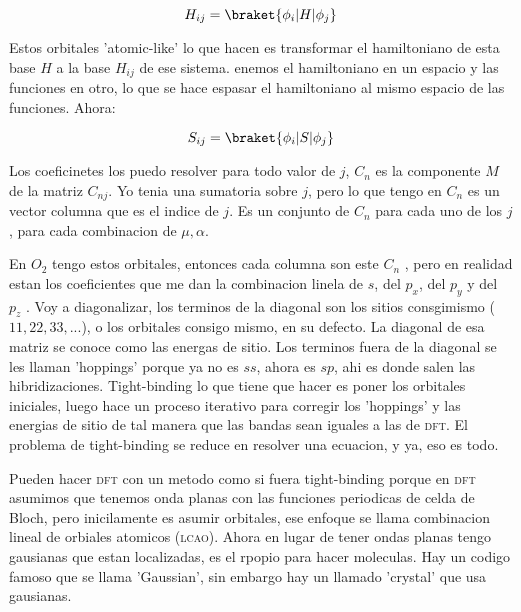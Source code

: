 \documentclass[11pt,fleqn]{book}
\begin{document}
\begin{equation}
    H_{ij}=\braket{\phi_{i}|H|\phi_{j}}
\end{equation}

Estos orbitales 'atomic-like' lo que hacen es transformar el hamiltoniano de esta base $H$ a la base $H_{ij}$ de ese sistema. enemos el hamiltoniano en un espacio y las funciones en otro, lo que se hace espasar el hamiltoniano al mismo espacio de las funciones. Ahora:

\begin{equation}
    S_{ij}=\braket{\phi_{i}|S|\phi_{j}}
\end{equation}

Los coeficinetes los puedo resolver para todo valor de $j$, $C_{n}$ es la componente $M$ de la matriz $C_{nj}$. Yo tenia una sumatoria sobre $j$, pero lo que tengo en $C_{n}$ es un vector columna que es el indice de $j$. Es un conjunto de $C_{n}$ para cada uno de los $j$, para cada combinacion de $\mu,\alpha$.


En $O_{2}$ tengo estos orbitales, entonces cada columna son este $C_{n}$ , pero en realidad estan los coeficientes que me dan la combinacion linela de $s$, del $p_{x}$, del $p_{y}$ y del $p_{z}$ . Voy a diagonalizar, los terminos de la diagonal son los sitios consgimismo ($11, 22, 33,...$), o los orbitales consigo mismo, en su defecto. La diagonal de esa matriz se conoce como las energas de sitio. Los terminos  fuera de la diagonal se les llaman 'hoppings' porque ya no es $ss$, ahora es $sp$,  ahi es donde salen las hibridizaciones. Tight-binding lo que tiene que hacer es poner los orbitales iniciales, luego hace un proceso iterativo para corregir los 'hoppings' y las energias de sitio de tal manera que las bandas sean iguales a las de \textsc{dft}. El problema de tight-binding se reduce en resolver una ecuacion, y ya, eso es todo.

Pueden hacer \textsc{dft} con un metodo como si fuera tight-binding porque en \textsc{dft} asumimos que tenemos onda planas con las funciones periodicas de celda de Bloch, pero inicilamente es asumir orbitales, ese enfoque se llama combinacion lineal de orbiales atomicos (\textsc{lcao}). Ahora en lugar de tener ondas planas tengo gausianas que estan localizadas, es el rpopio para hacer moleculas. Hay un codigo famoso que se llama 'Gaussian', sin embargo hay un llamado 'crystal' que usa gausianas. 

\end{document}
